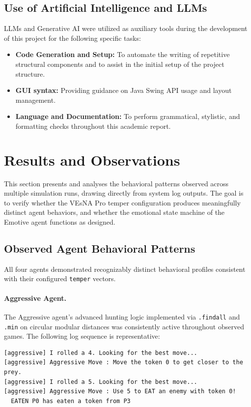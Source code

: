 \documentclass[12pt]{article}
\begin{document}
\subsection{Use of Artificial Intelligence and LLMs}
\label{subsec:ai_usage}
\noindent LLMs and Generative AI were utilized as auxiliary tools during the development of this project for the following specific tasks:
\begin{itemize}
    \item \textbf{Code Generation and Setup:} To automate the writing of repetitive structural components and to assist in the initial setup of the project structure.
     \item \textbf{GUI syntax:} Providing guidance on Java Swing API usage and layout management.
    \item \textbf{Language and Documentation:} To perform grammatical, stylistic, and formatting checks throughout this academic report.
\end{itemize}




\section{Results and Observations}
\label{sec:results}
\noindent This section presents and analyses the behavioral patterns observed
across multiple simulation runs, drawing directly from system log outputs.
The goal is to verify whether the VEsNA Pro temper configuration produces
meaningfully distinct agent behaviors, and whether the emotional state machine
of the Emotive agent functions as designed.

\subsection{Observed Agent Behavioral Patterns}
\label{subsec:behaviors}
\noindent All four agents demonstrated recognizably distinct behavioral profiles
consistent with their configured \texttt{temper} vectors.

\paragraph{Aggressive Agent.}
\noindent The Aggressive agent's advanced hunting logic implemented via
\texttt{.findall} and \texttt{.min} on circular modular distances was
consistently active throughout observed games. The following log sequence is
representative:

\begin{lstlisting}
[aggressive] I rolled a 4. Looking for the best move...
[aggressive] Aggressive Move : Move the token 0 to get closer to the prey.
[aggressive] I rolled a 5. Looking for the best move...
[aggressive] Aggressive Move : Use 5 to EAT an enemy with token 0!
  EATEN P0 has eaten a token from P3
\end{lstlisting}
\end{document}
